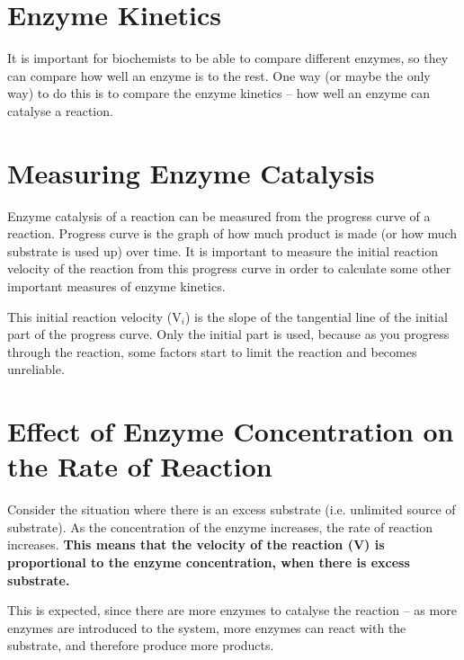 \section{Enzyme Kinetics}

It is important for biochemists to be able to compare different enzymes, so they can compare how well an enzyme is to the rest.
One way (or maybe the only way) to do this is to compare the enzyme kinetics -- how well an enzyme can catalyse a reaction.

\section{Measuring Enzyme Catalysis}

\begin{center}
\end{center}

Enzyme catalysis of a reaction can be measured from the progress curve of a reaction.
Progress curve is the graph of how much product is made (or how much substrate is used up) over time.
It is important to measure the initial reaction velocity of the reaction from this progress curve in order to calculate some other important measures of enzyme kinetics.

This initial reaction velocity (V$_i$) is the slope of the tangential line of the initial part of the progress curve.
Only the initial part is used, because as you progress through the reaction, some factors start to limit the reaction and becomes unreliable.

\section{Effect of Enzyme Concentration on the Rate of Reaction}

\begin{center}
\end{center}

Consider the situation where there is an excess substrate (i.e. unlimited source of substrate).
As the concentration of the enzyme increases, the rate of reaction increases.
\textbf{This means that the velocity of the reaction (V) is proportional to the enzyme concentration, when there is excess substrate.}

This is expected, since there are more enzymes to catalyse the reaction -- as more enzymes are introduced to the system, more enzymes can react with the substrate, and therefore produce more products.

